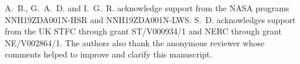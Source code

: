 \documentclass{aastex61}
\begin{document}
\begin{acknowledgments}
A.~B., G.~A.~D. and I.~G.~R. acknowledge support from the NASA programs NNH19ZDA001N-HSR and NNH19ZDA001N-LWS. S.~D. acknowledges support from the UK STFC through grant ST/V000934/1 and NERC through grant NE/V002864/1.
The authors also thank the anonymous reviewer whose comments helped to improve and clarify this manuscript.
\end{acknowledgments}



{}

\end{document}
